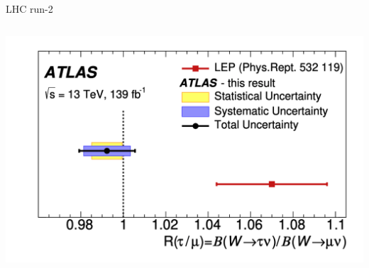 \begin{frame}{}
\begin{block}{LHC run-2}
\begin{columns}[c]
            \centering
            \includegraphics[width=\textwidth]{chapters/Introduction/sectionRelatedWorks/figures/atlas.png}
        \end{columns}
    \end{block}
\end{frame}







